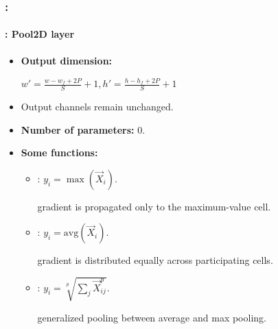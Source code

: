 \documentclass[xcolor=table]{beamer}
\begin{document}
\begin{frame}
	\frametitle{\insertshortsubtitle: \insertsection}
	\framesubtitle{\insertsubsection: Pool2D layer}

\begin{minipage}{0.69\textwidth} 
	\begin{itemize}
		\item \textbf{Output dimension:}
		
		$w' = \frac{w - w_f + 2P}{S} + 1, h' = \frac{h - h_f + 2P}{S} + 1$
		\item Output channels remain unchanged.
		\item \textbf{Number of parameters:} 0.
		
		\item \textbf{Some functions:}
		\begin{itemize}
			\item {}: $y_i = \max(\vec{X}_i)$.
			
			gradient is propagated only to the maximum-value cell.
			
			\item {}: $y_i = \text{avg}(\vec{X}_i)$.
			
			gradient is distributed equally across participating cells.
			
			\item {}: $y_i = \sqrt[p]{\sum_{j} \vec{X}_{ij}^p}$.
			
			generalized pooling between average and max pooling.
			
		\end{itemize}
	\end{itemize}
\end{minipage}
%
\begin{minipage}{0.30\textwidth}
	
\end{minipage}

\end{frame}
\end{document}
